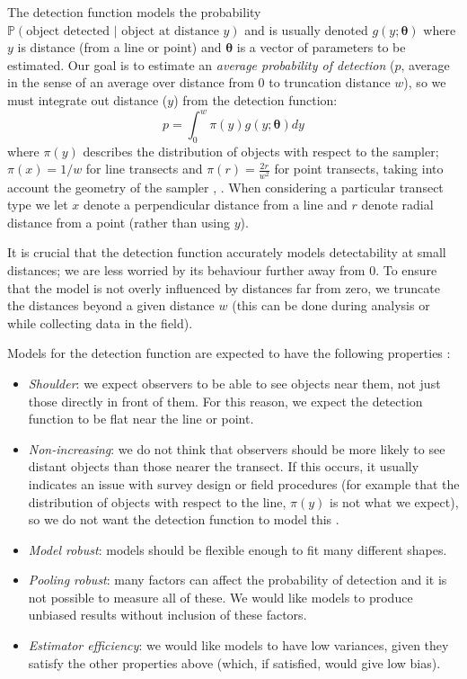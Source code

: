 \documentclass[article]{jss}
\begin{document}
The detection function models the probability $\mathbb{P}(\text{object detected } \vert \text{ object at distance } y)$ and is usually denoted $g(y; \boldsymbol{\theta})$ where $y$ is distance (from a line or point) and $\boldsymbol{\theta}$ is a vector of parameters to be estimated. Our goal is to estimate an \textit{average probability of detection} ($p$, average in the sense of an average over distance from $0$ to truncation distance $w$), so we must integrate out distance ($y$) from the detection function:
$$
p = \int_0^w \pi(y) g(y; \boldsymbol{\theta}) dy
$$
where $\pi(y)$ describes the distribution of objects with respect to the sampler; $\pi(x)=1/w$ for line transects and $\pi(r)=\frac{2r}{w^2}$ for point transects, taking into account the geometry of the sampler \citep[usually referred to as the \textit{probability density function of distances}][Chapter 3]{Buckland:2001vm}, . When considering a particular transect type we let $x$ denote a perpendicular distance from a line and $r$ denote radial distance from a point (rather than using $y$).

It is crucial that the detection function accurately models detectability at small distances; we are less worried by its behaviour further away from 0. To ensure that the model is not overly influenced by distances far from zero, we truncate the distances beyond a given distance $w$ (this can be done during analysis or while collecting data in the field).

Models for the detection function are expected to have the following properties \citep[][Chapter 5]{buckland2015distance}:

\begin{itemize}
\item \textit{Shoulder}: we expect observers to be able to see objects near them, not just those directly in front of them. For this reason, we expect the detection function to be flat near the line or point.
\item \textit{Non-increasing}: we do not think that observers should be more likely to see distant objects than those nearer the transect. If this occurs, it usually indicates an issue with survey design or field procedures (for example that the distribution of objects with respect to the line, $\pi(y)$ is not what we expect), so we do not want the detection function to model this \citep{Marques:2010he, Marques:2012fy, Miller:2015hw}.
\item \textit{Model robust}: models should be flexible enough to fit many different shapes.
\item \textit{Pooling robust}: many factors can affect the probability of detection and it is not possible to measure all of these. We would like models to produce unbiased results without inclusion of these factors.
\item \textit{Estimator efficiency}: we would like models to have low variances, given they satisfy the other properties above (which, if satisfied, would give low bias).
\end{itemize}
\end{document}
